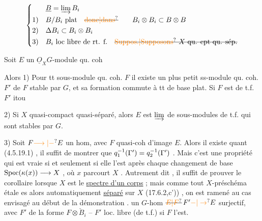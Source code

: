 
\[
\left\{\begin{aligned}
 &\underline{B}=\varinjlim B_i\\
1)\quad &B/B_i\ \text{plat}\quad\text{\deleted{\unsure{donc|dans}}}\qquad B_i\otimes B_i\subset B\otimes B\\
2)\quad &\Delta B_i\subset B_i\otimes B_i\\
3)\quad &B_i\ \text{loc libre de rt. f.}\quad \deleted{\text{\unsure{Suppos.|Supposons} $X$ qu. cpt qu. sép.}}
\end{aligned}\right.
\]

Soit $E$ un $\underline{O}_{X}G$-module qu. coh\ 

Alors 1) Pour tt sous-module qu. coh. $F$
il existe un plus petit ss-module qu.
coh. $F'$ de $F$  stable par $G$, et
sa formation commute à tt  de
base plat. Si $F$ est de t.f. $F'$ itou

2) Si $X$ quasi-compact quasi-séparé, alors
$E$ est $\varinjlim$ de sous-modules  de t.f.
qui sont stables par $G$.

3)  Soit $F\unsure{\longrightarrow|-}E$ un hom, avec $F$ quasi-coh 
 d'image  $E$. Alors il existe
quant (4.5.19.1) , il suffit de montrer que $q_1^{-1}(\Gamma')=q_2^{-1}(\Gamma')$ . Mais
c'est une propriété  qui est vraie si  et seulement
si elle l'est après chaque changement de base $\operatorname{Spec}(\kappa(x))\longrightarrow X$ , où
$x$ parcourt $X$ . Autrement dit , il suffit de prouver le corollaire lorsque
$X$ est le \uline{spectre d'un corps} ; mais comme tout $X$-préschéma étale es
alors automatiquement \uline{séparé} sur $X$ (17.6.2,c')) , on est ramené au cas
envisagé au début de la démonstration .
un $G$-hom $\deleted{\unsure{E|F}}\,F'\unsure{-|\to}E$ surjectif, avec
$F'$ de la forme $F\otimes\check{B}_i$ --  $F'$ loc.
libre (de t.f.) si $F$ l'est.

